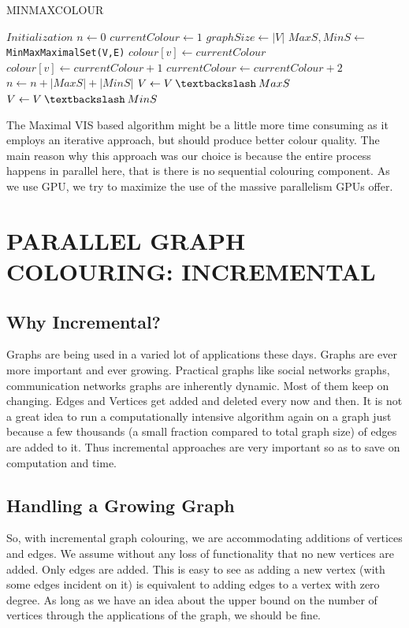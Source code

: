 \documentclass[MTech]{iitmdiss}
\begin{document}
\begin{algorithm}
\caption{MINMAXCOLOUR}\label{MinMaxAlgo}
\begin{algorithmic}[1]
\State $\textit{Initialization}$
\State $n \gets 0$
\State $currentColour \gets 1$
\State $graphSize \gets |V|$
  \label{10.6}
\State $MaxS, MinS \gets $\verb+MinMaxMaximalSet(V,E)+
 \label{10.8}
\State $colour[v] \gets currentColour$ \label{10.9}
\EndFor
{} \label{10.10}
\State $colour[v] \gets currentColour+1$ \label{10.11}
\EndFor
\State $currentColour \gets currentColour+2$
\State $n \gets n+|MaxS|+|MinS|$
\State $V \gets V \: \textbackslash \: MaxS$
\State $V \gets V \: \textbackslash \: MinS$
\EndWhile
\EndProcedure
\end{algorithmic}
\end{algorithm}

The Maximal VIS based algorithm might be a little more time consuming as it employs an iterative approach, but should produce better colour quality. The main reason why this approach was our choice is because the entire process happens in parallel here, that is there is no sequential colouring component. As we use GPU, we try to maximize the use of the massive parallelism GPUs offer.
\chapter{PARALLEL GRAPH COLOURING: INCREMENTAL}
\section{Why Incremental?}
Graphs are being used in a varied lot of applications these days. Graphs are ever more important and ever growing. Practical graphs like social networks graphs, communication networks graphs are inherently dynamic. Most of them keep on changing. Edges and Vertices get added and deleted every now and then. It is not a great idea to run a computationally intensive algorithm again on a graph just because a few thousands (a small fraction compared to total graph size) of edges are added to it. Thus incremental approaches are very important so as to save on computation and time.

\section{Handling a Growing Graph}
So, with incremental graph colouring, we are accommodating additions of vertices and edges. We assume without any loss of functionality that no new vertices are added. Only edges are added. This is easy to see as adding a new vertex (with some edges incident on it) is equivalent to adding edges to a vertex with zero degree. As long as we have an idea about the upper bound on the number of vertices through the applications of the graph, we should be fine. 
\end{document}

